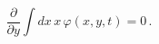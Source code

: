 \begin{equation}
\frac{\partial}{\partial y} \int dx\, x\, \varphi(x,y,t) = 0 \, .
\label{eq14}
\end{equation}

